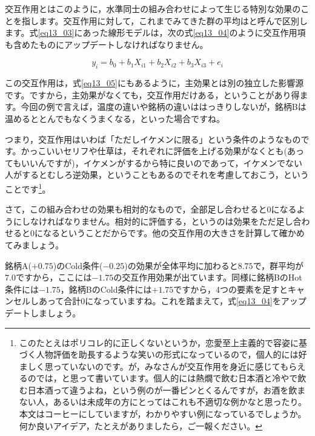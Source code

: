 \documentclass{ltjbook}
\begin{document}
交互作用とはこのように，水準同士の組み合わせによって生じる特別な効果のことを指します。交互作用に対して，これまでみてきた群の平均はと呼んで区別します。式\ref{eq13_03}にあった線形モデルは，次の式\ref{eq13_04}のように交互作用項も含めたものにアップデートしなければなりません。

\begin{equation}
  \label{eq13_05}
y_i = b_0 + b_1 X_{i1}+ b_2 X_{i2} + b_3 X_{i3} + e_{i}
\end{equation}

この交互作用は，式\ref{eq13_05}にもあるように，主効果とは別の独立した影響源です。ですから，主効果がなくても，交互作用だけある，ということがあり得ます。今回の例で言えば，温度の違いや銘柄の違いははっきりしないが，銘柄Bは温めるととんでもなくうまくなる，といった場合ですね。

つまり，交互作用はいわば「ただしイケメンに限る」という条件のようなものです。かっこいいセリフや仕草は，それぞれに評価を上げる効果がなくとも(あってもいいんですが)，イケメンがするから特に良いのであって，イケメンでない人がするとむしろ逆効果，ということもあるのでそれを考慮しておこう，ということです\footnote{このたとえはポリコレ的に正しくないというか，恋愛至上主義的で容姿に基づく人物評価を助長するような笑いの形式になっているので，個人的には好ましく思っていないのです。が，みなさんが交互作用を身近に感じてもらえるのでは，と思って書いています。個人的には熱燗で飲む日本酒と冷やで飲む日本酒って違うよね，という例のが一番ピンとくるんですが，お酒を飲まない人，あるいは未成年の方にとってはこれも不適切な例かなと思ったり。本文はコーヒーにしていますが，わかりやすい例になっているでしょうか。何か良いアイデア，たとえがありましたら，ご一報ください。}。

さて，この組み合わせの効果も相対的なもので，全部足し合わせると$0$になるようにしなければなりません。相対的に評価する，というのは効果をただ足し合わせると$0$になるということだからです。他の交互作用の大きさを計算して確かめてみましょう。

銘柄A($+0.75$)のCold条件($-0.25$)の効果が全体平均に加わると$8.75$で，群平均が$7.0$ですから，ここには$-1.75$の交互作用効果が出ています。同様に銘柄BのHot条件には$-1.75$，銘柄BのCold条件には$+1.75$ですから，4つの要素を足すとキャンセルしあって合計$0$になっていますね。これを踏まえて，式\ref{eq13_04}をアップデートしましょう。
\end{document}
